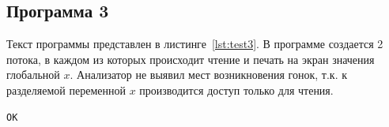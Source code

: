 \subsection{Программа 3}

Текст программы представлен в листинге~\ref{lst:test3}. В программе создается 2 потока, в каждом из которых происходит чтение и печать на экран значения глобальной $x$. Анализатор не выявил мест возникновения гонок, т.к. к разделяемой переменной $x$ производится доступ только для чтения.
\begin{verbatim}
OK
\end{verbatim}


